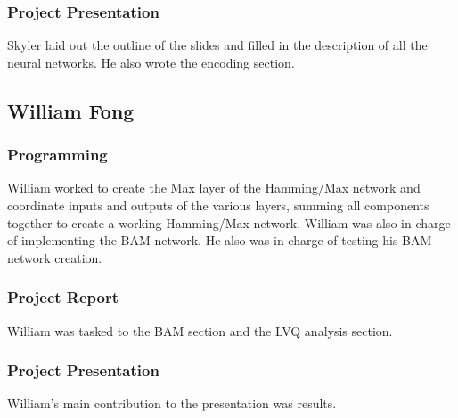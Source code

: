 \documentclass{article}
\begin{document}
\subsubsection{Project Presentation}
Skyler laid out the outline of the slides and filled in the description of all the neural networks. He also wrote the encoding section.

\subsection{William Fong}
\subsubsection{Programming}
William worked to create the Max layer of the Hamming/Max network and coordinate 
inputs and outputs of the various layers, summing all components together to create a working Hamming/Max network. William was also in charge of implementing the BAM network. He also was in charge of testing his BAM network creation.
\subsubsection{Project Report}
William was tasked to the BAM section and the LVQ analysis section.

\subsubsection{Project Presentation}
William's main contribution to the presentation was results.
\end{document}
